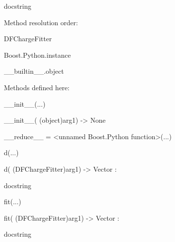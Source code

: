 \documentclass[letterpaper,10pt,english]{sphinxmanual}
\begin{document}
\begin{description}
\begin{description}
\item[{class DFChargeFitter(Boost.Python.instance)}] \leavevmode
\begin{DUlineblock}{0em}
\item[] docstring
\item[] 
\item[] Method resolution order:
\item[]
\begin{DUlineblock}{\DUlineblockindent}
\item[] DFChargeFitter
\item[] Boost.Python.instance
\item[] \_\_builtin\_\_.object
\item[] 
\end{DUlineblock}
\item[] Methods defined here:
\item[] 
\item[] \_\_init\_\_(...)
\item[]
\begin{DUlineblock}{\DUlineblockindent}
\item[] \_\_init\_\_( (object)arg1) -\textgreater{} None
\item[] 
\end{DUlineblock}
\item[] \_\_reduce\_\_ = \textless{}unnamed Boost.Python function\textgreater{}(...)
\item[] 
\item[] d(...)
\item[]
\begin{DUlineblock}{\DUlineblockindent}
\item[] d( (DFChargeFitter)arg1) -\textgreater{} Vector :
\item[]
\begin{DUlineblock}{\DUlineblockindent}
\item[] docstring
\item[] 
\end{DUlineblock}
\end{DUlineblock}
\item[] fit(...)
\item[]
\begin{DUlineblock}{\DUlineblockindent}
\item[] fit( (DFChargeFitter)arg1) -\textgreater{} Vector :
\item[]
\begin{DUlineblock}{\DUlineblockindent}
\item[] docstring
\item[] 

\end{DUlineblock}
\end{DUlineblock}
\end{DUlineblock}
\end{description}
\end{description}
\end{document}
